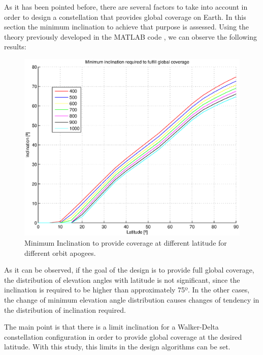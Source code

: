 As it has been pointed before, there are several factors to take into account in order to design a constellation that provides global coverage on Earth. In this section the minimum inclination to achieve that purpose is assessed. Using the theory previously developed in the MATLAB code \cite[Chapter 1, Section 2]{annex6}, we can observe the following results:

\begin{figure}[H]
\includegraphics[scale=0.8]{MinimumInclinationPlot}
\caption{Minimum Inclination to provide coverage at different latitude for different orbit apogees.}	
\end{figure}

As it can be observed, if the goal of the design is to provide full global coverage, the distribution of elevation angles with latitude is not significant, since the inclination is required to be higher than approximately 75º. In the other cases, the change of minimum elevation angle distribution causes changes of tendency in the distribution of inclination required. 

The main point is that there is a limit inclination for a Walker-Delta constellation configuration in order to provide global coverage at the desired latitude. With this study, this limits in the design algorithms can be set.